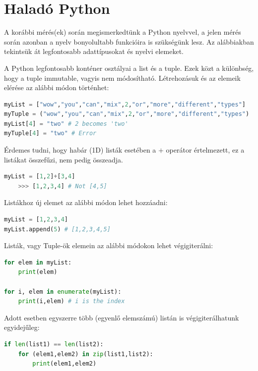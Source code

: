 \documentclass[12pt,a4paper,oneside]{report}             %
\begin{document}
\section{Haladó Python}

A korábbi mérés(ek) során megismerkedtünk a Python nyelvvel, a jelen mérés során azonban a nyelv bonyolultabb funkcióira is szükségünk lesz. Az alábbiakban tekintsük át legfontosabb adattípusokat és nyelvi elemeket.

A Python legfontosabb konténer osztályai a list és a tuple. Ezek közt a különbség, hogy a tuple immutable, vagyis nem módosítható. Létrehozásuk és az elemeik elérése az alábbi módon történhet:

\begin{lstlisting}[language=Python]
myList = ["wow","you","can","mix",2,"or","more","different","types"]
myTuple = ("wow","you","can","mix",2,"or","more","different","types")
myList[4] = "two" # 2 becomes 'two'
myTuple[4] = "two" # Error
\end{lstlisting}

Érdemes tudni, hogy habár (1D) listák esetében a $+$ operátor értelmezett, ez a listákat összefűzi, nem pedig összeadja.

\begin{lstlisting}[language=Python]
myList = [1,2]+[3,4]
	>>> [1,2,3,4] # Not [4,5]
\end{lstlisting}

Listákhoz új elemet az alábbi módon lehet hozzáadni:

\begin{lstlisting}[language=Python]
myList = [1,2,3,4]
myList.append(5) # [1,2,3,4,5]
\end{lstlisting}

Listák, vagy Tuple-ök elemein az alábbi módokon lehet végigiterálni:

\begin{lstlisting}[language=Python]
for elem in myList:
	print(elem)
	
for i, elem in enumerate(myList):
	print(i,elem) # i is the index
\end{lstlisting}

Adott esetben egyszerre több (egyenlő elemszámú) listán is végigiterálhatunk egyidejűleg:

\begin{lstlisting}[language=Python]
if len(list1) == len(list2):
	for (elem1,elem2) in zip(list1,list2):
		print(elem1,elem2)
\end{lstlisting}
\end{document}
